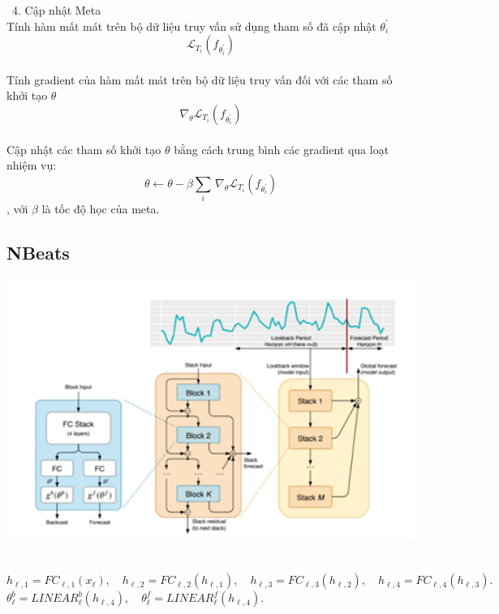         \indent\textbullet\ 4. Cập nhật Meta\\
            Tính hàm mất mát trên bộ dữ liệu truy vấn sử dụng tham số đã cập nhật \(\theta_i^\prime\) \\ 
            \[\mathcal{L}_{T_i}\left(f_{\theta_i^\prime}\right)\]\\
            Tính gradient của hàm mất mát trên bộ dữ liệu truy vấn đối với các tham số khởi tạo \(\theta\) \\
            \[\nabla_\theta\mathcal{L}_{T_i}\left(f_{\theta_i^\prime}\right)\] \\
            Cập nhật các tham số khởi tạo \(\theta\) bằng cách trung bình các gradient qua loạt nhiệm vụ: \\
            \[\theta \gets \theta - \beta \sum_{i} \, \nabla_{\theta} \mathcal{L}_{T_{i}} \left( f_{\theta_{i}^{\prime}} \right)\]
            , với \(\beta\) là tốc độ học của meta.

\subsection{NBeats}
\begin{minipage}{0.45\textwidth}
\centering
\includegraphics[width=1\textwidth]{resources/chapter-4/nbeats-1.png}
\end{minipage}
\\
\({h}_{\ell,1} = FC_{\ell,1}({x}_{\ell}), \quad {h}_{\ell,2} = FC_{\ell,2}({h}_{\ell,1}), \quad {h}_{\ell,3} = FC_{\ell,3}({h}_{\ell,2}), \quad {h}_{\ell,4} = FC_{\ell,4}({h}_{\ell,3}).\) \\
\(\theta^b_{\ell} = LINEAR_{\ell}^{b}({h}_{\ell,4}), \quad \theta^f_{\ell} = LINEAR_{\ell}^{f}({h}_{\ell,4}).\) \\

